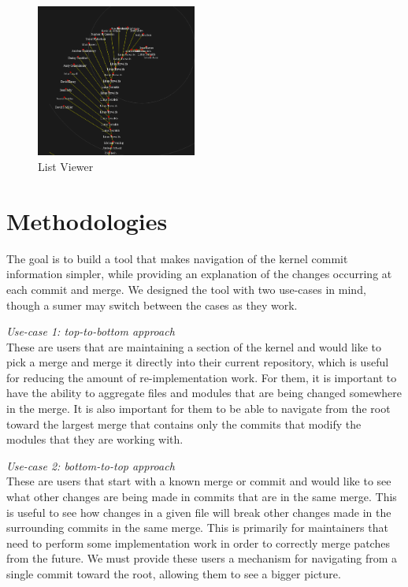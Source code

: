 \documentclass[conference, draftclsnofoot]{IEEEtran}
\begin{document}

\begin{figure}
        \centering
        \includegraphics[width=0.47\textwidth]{figures/gitvis.png}
        \caption{List Viewer}
        \label{fig:listviewer}
\end{figure}

\section{Methodologies}

The goal is to build a tool that makes navigation of the kernel commit
information simpler, while providing an explanation of the changes occurring at
each commit and merge. We designed the tool with two use-cases in mind, though a
sumer may switch between the cases as they work.

\textit{Use-case 1: top-to-bottom approach}\label{sec:usecase1}\\
These are users that are maintaining a section of the kernel and would like to pick
a merge and merge it directly into their current repository, which is useful for
reducing the amount of re-implementation work. For them, it is
important to have the ability to aggregate files and modules that are being changed
somewhere in the merge. It is also important for them to be able to navigate from
the root toward the largest merge that contains only the commits that modify the
modules that they are working with.

\textit{Use-case 2: bottom-to-top approach}\label{sec:usecase2}\\
These are users that start with a known merge or commit and would like to see
what other changes are being made in commits that are in the same merge. This is
useful to see how changes in a given file will break other changes made in the
surrounding commits in the same merge. This is primarily for maintainers that need
to perform some implementation work in order to correctly merge patches from the
future. We must provide these users a mechanism for navigating from a single commit
toward the root, allowing them to see a bigger picture.
\end{document}
